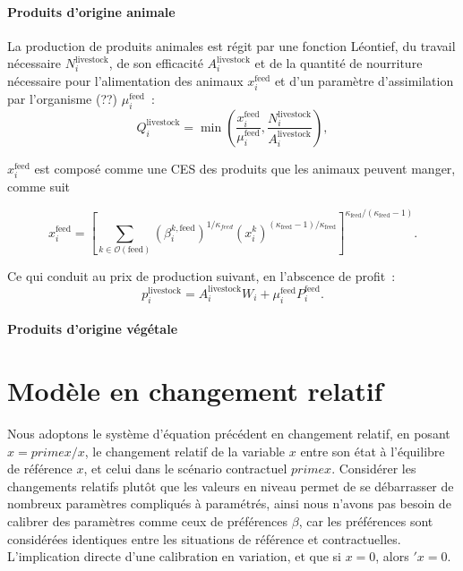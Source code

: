 \paragraph{Produits d’origine animale}
La production de produits animales est régit par une fonction Léontief, du travail nécessaire $N_i^\text{livestock}$, de son efficacité $A_i^\text{livestock}$ et de la quantité de nourriture nécessaire pour l’alimentation des animaux $x_i^\text{feed}$ et d’un paramètre d’assimilation par l’organisme (??) $\mu_i^\text{feed}$~:
\begin{equation}
	Q_i^{\text{livestock}} = \min \left(\frac{x^{\text{feed}}_i}{\mu^{\text{feed}}_i}, \frac{N_i^\text{livestock}}{A_i^\text{livestock}}\right),
\end{equation}

$x_i^\text{feed}$ est composé comme une CES des produits que les animaux peuvent manger, comme suit

\begin{equation}
	x_i^\text{feed} = \left[ \sum_{k \in \mathcal{O}(\text{feed})} (\beta_i^{k, \text{feed}})^{1/\kappa_{feed}} (x_i^k)^{(\kappa_{\text{feed}} - 1) / \kappa_{\text{feed}}}  \right]^{\kappa_{\text{feed}}/(\kappa_{\text{feed}} - 1)}.
\end{equation}

Ce qui conduit au prix de production suivant, en l’abscence de profit~:
\begin{equation}
	p_i^{\text{livestock}} = A_i^\text{livestock} W_i + \mu^\text{feed}_i P^{\text{feed}}_i.
\end{equation}


\paragraph{Produits d’origine végétale}


\section{Modèle en changement relatif}

Nous adoptons le système d’équation précédent en changement relatif, en posant $\hat{x} = prime{x}/x$, le changement relatif de la variable $x$ entre son état à l’équilibre de référence $x$, et celui dans le scénario contractuel $prime{x}$. Considérer les changements relatifs plutôt que les valeurs en niveau permet de se débarrasser de nombreux paramètres compliqués à paramétrés, ainsi nous n’avons pas besoin de calibrer des paramètres comme ceux de préférences $\beta$, car les préférences sont considérées identiques entre les situations de référence et contractuelles. L’implication directe d’une calibration en variation, et que si $x = 0$, alors $\prime{x} = 0$.
